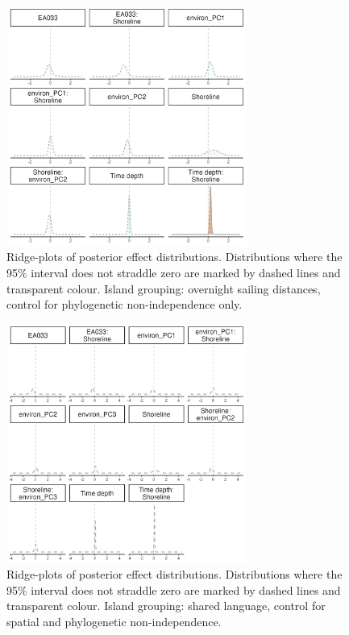 \documentclass[unnumsec,webpdf,modern,medium]{oup-authoring-template}
\begin{document}
\begin{figure}
\includegraphics[width=0.7\textwidth]{brms_SBZR_control_phylo_group_full_effect_ridge_panels_plot.png}
\caption{Ridge-plots of posterior effect distributions. Distributions where the 95\% interval does not straddle zero are marked by dashed lines and transparent colour. Island grouping: overnight sailing distances, control for phylogenetic non-independence only.}
\label{brms_SBZR_group_full_effect_ridge_panels_phylo_main_text}
\end{figure}

\begin{figure}
\includegraphics[width=0.7\textwidth]{brms_medium_control_spatialphylo_group_full_effect_ridge_panels_plot.png}
\caption{Ridge-plots of posterior effect distributions. Distributions where the 95\% interval does not straddle zero are marked by dashed lines and transparent colour. Island grouping: shared language, control for spatial and phylogenetic non-independence.}
\label{brms_medium_control_spatialphylo_group_full_effect_ridge_panels_plot_main_text}
\end{figure}
\end{document}
